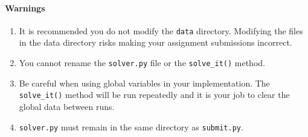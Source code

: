\paragraph{Warnings} 

\begin{enumerate}
\item It is recommended you do not modify the \texttt{data} directory.  Modifying the files in the data directory risks
making your assignment submissions incorrect.
\item You cannot rename the \texttt{solver.py} file or the \texttt{solve\_it()} method.
\item Be careful when using global variables in your implementation.  The \texttt{solve\_it()} method will be run repeatedly and it is your job to clear the global data between runs.
\item \texttt{solver.py} must remain in the same directory as \texttt{submit.py}.
\end{enumerate}
